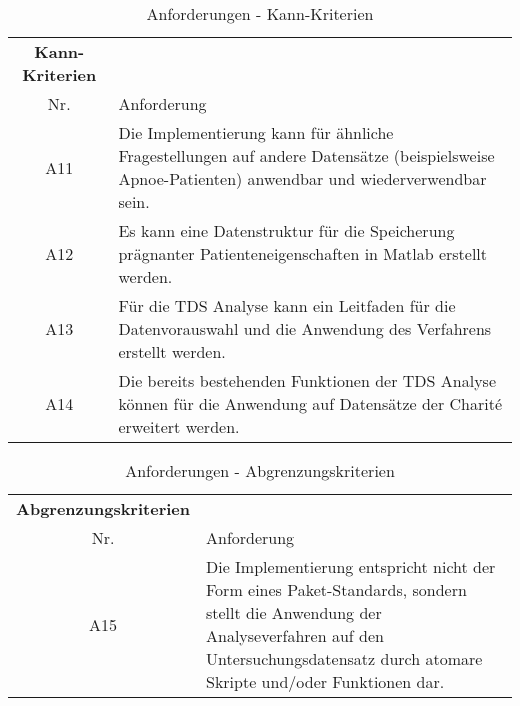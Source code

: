 \begin{table}[H] 
\begin{tabularx}{\textwidth}{cllX}
\toprule
\multicolumn{3}{c}{\textbf{Kann-Kriterien}} & \\  
\cmidrule{1-3}
\multicolumn{3}{c}{Nr.} & Anforderung\\ 
\midrule 
\multicolumn{3}{c}{A11} &  Die Implementierung kann für ähnliche Fragestellungen auf andere Datensätze (beispielsweise Apnoe-Patienten) anwendbar und wiederverwendbar sein.\\
\multicolumn{3}{c}{A12} & Es kann eine Datenstruktur für die Speicherung prägnanter Patienteneigenschaften in Matlab erstellt werden.\\
\multicolumn{3}{c}{A13} & Für die \acs{TDS} Analyse kann ein Leitfaden für die Datenvorauswahl und die Anwendung des Verfahrens erstellt werden.\\ 
\multicolumn{3}{c}{A14} & Die bereits bestehenden Funktionen der \acs{TDS} Analyse können für die Anwendung auf Datensätze der Charit\'{e} erweitert werden.\\ 
\bottomrule
\end{tabularx}
\caption{Anforderungen - Kann-Kriterien}
\label{tab:Kann-Kriterien}
\end{table}


\begin{table}[H] 
\begin{tabularx}{\textwidth}{cllX}
\toprule
\multicolumn{3}{c}{\textbf{Abgrenzungskriterien}} & \\  
\cmidrule{1-3}
\multicolumn{3}{c}{Nr.} & Anforderung\\ 
\midrule 
\multicolumn{3}{c}{A15} &  Die Implementierung entspricht nicht der Form eines Paket-Standards, sondern stellt die Anwendung der Analyseverfahren auf den Untersuchungsdatensatz durch atomare Skripte und/oder Funktionen dar.\\
\bottomrule
\end{tabularx}
\caption{Anforderungen - Abgrenzungskriterien}
\label{tab:Abgr-Kriterien}
\end{table}
